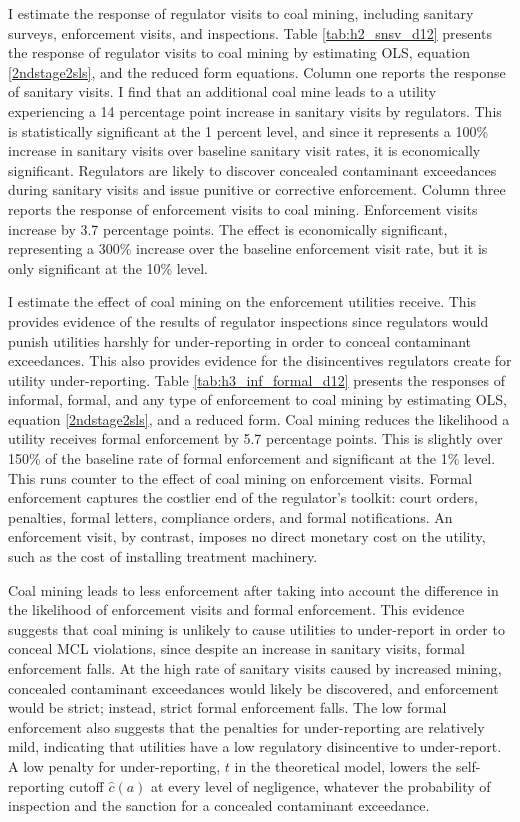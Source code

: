 \documentclass[12pt]{article}
\begin{document}
I estimate the response of regulator visits to coal mining, including sanitary surveys, enforcement visits, and inspections. Table \ref{tab:h2_snsv_d12} presents the response of regulator visits to coal mining by estimating OLS, equation \ref{2ndstage2sls}, and the reduced form equations. Column one reports the response of sanitary visits. I find that an additional coal mine leads to a utility experiencing a 14 percentage point increase in sanitary visits by regulators. This is statistically significant at the 1 percent level, and since it represents a 100\% increase in sanitary visits over baseline sanitary visit rates, it is economically significant. Regulators are likely to discover concealed contaminant exceedances during sanitary visits and issue punitive or corrective enforcement. Column three reports the response of enforcement visits to coal mining. Enforcement visits increase by 3.7 percentage points. The effect is economically significant, representing a 300\% increase over the baseline enforcement visit rate, but it is only significant at the 10\% level.

I estimate the effect of coal mining on the enforcement utilities receive. This provides evidence of the results of regulator inspections since regulators would punish utilities harshly for under-reporting in order to conceal contaminant exceedances. This also provides evidence for the disincentives regulators create for utility under-reporting. Table \ref{tab:h3_inf_formal_d12} presents the responses of informal, formal, and any type of enforcement to coal mining by estimating OLS, equation \ref{2ndstage2sls}, and a reduced form. Coal mining reduces the likelihood a utility receives formal enforcement by 5.7 percentage points. This is slightly over 150\% of the baseline rate of formal enforcement and significant at the 1\% level. This runs counter to the effect of coal mining on enforcement visits. Formal enforcement captures the costlier end of the regulator's toolkit: court orders, penalties, formal letters, compliance orders, and formal notifications. An enforcement visit, by contrast, imposes no direct monetary cost on the utility, such as the cost of installing treatment machinery. 

Coal mining leads to less enforcement after taking into account the difference in the likelihood of enforcement visits and formal enforcement. This evidence suggests that coal mining is unlikely to cause utilities to under-report in order to conceal MCL violations, since despite an increase in sanitary visits, formal enforcement falls. At the high rate of sanitary visits caused by increased mining, concealed contaminant exceedances would likely be discovered, and enforcement would be strict; instead, strict formal enforcement falls. The low formal enforcement also suggests that the penalties for under-reporting are relatively mild, indicating that utilities have a low regulatory disincentive to under-report. A low penalty for under-reporting, $t$ in the theoretical model, lowers the self-reporting cutoff $\hat{c}(a)$ at every level of negligence, whatever the probability of inspection and the sanction for a concealed contaminant exceedance.
\end{document}
